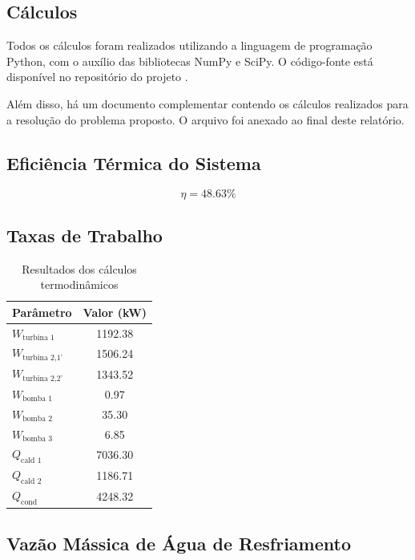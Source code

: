 \documentclass[
	article,			%
	11pt,				%
	oneside,			%
	a4paper,			%
	english,			%
	brazil,				%
	sumario=tradicional
	]{abntex2}
\begin{document}
\subsection{Cálculos}
\label{sec:calculos}

Todos os cálculos foram realizados utilizando a linguagem de programação Python, com o auxílio das bibliotecas NumPy e SciPy. O código-fonte está disponível no repositório do projeto \cite{Arruda_Rankine_2025}.

Além disso, há um documento complementar contendo os cálculos realizados para a resolução do problema proposto. O arquivo foi anexado ao final deste relatório.

\subsection{Eficiência Térmica do Sistema}

$$\eta = 48.63\%$$

\subsection{Taxas de Trabalho}

\begin{table}[ht]
	\centering
	\caption{Resultados dos cálculos termodinâmicos}
	\label{tab:calculos}
	\begin{tabular}{lS[table-format=4.2]}
	\toprule
	{Parâmetro} & {Valor (\si{\kilo\watt})} \\
	\midrule
	$W_{\text{turbina 1}}$               & 1192.38 \\
	$W_{\text{turbina 2,1'}}$ & 1506.24 \\
	$W_{\text{turbina 2,2'}}$ & 1343.52 \\
	$W_{\text{bomba 1}}$                  &    0.97 \\
	$W_{\text{bomba 2}}$                  &   35.30 \\
	$W_{\text{bomba 3}}$                  &    6.85 \\
	$Q_{\text{cald 1}}$                   & 7036.30 \\
	$Q_{\text{cald 2}}$                   & 1186.71 \\
	$Q_{\text{cond}}$                     & 4248.32 \\
	\bottomrule
	\end{tabular}
	\end{table}

\subsection{Vazão Mássica de Água de Resfriamento}
\end{document}
